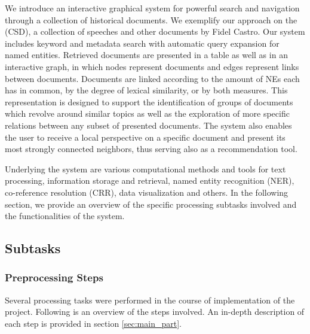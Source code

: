 We introduce an interactive graphical system for powerful search and navigation through a collection of historical documents. 
We exemplify our approach on the  (CSD), a collection of
speeches and other documents by Fidel Castro. Our system includes keyword and metadata search with automatic query 
expansion for named entities. 
Retrieved documents are presented in a table as well as in an interactive graph, in which nodes represent 
documents and edges represent links between documents. Documents are linked according to the amount of NEs each has in common, by the degree of lexical
similarity, or by both measures. This representation is designed to support the identification of groups of documents which revolve around similar topics as well as the exploration of more specific relations between any subset of presented documents. The system also enables the user to receive a local perspective on a 
specific document and present its most strongly connected neighbors, thus serving also as a recommendation tool. 

Underlying the system are various computational methods and tools for text processing, 
information storage and retrieval, named entity recognition (NER), co-reference resolution (CRR), 
data visualization and others. In the following section, we provide an overview of the specific processing subtasks involved and the functionalities of the system.

\subsection{Subtasks}
\label{sec:subtasks}
\subsubsection{Preprocessing Steps}

Several processing tasks were performed in the course of implementation of the project. Following is an overview of the steps involved. An in-depth description of each step is provided in section \ref{sec:main_part}.

